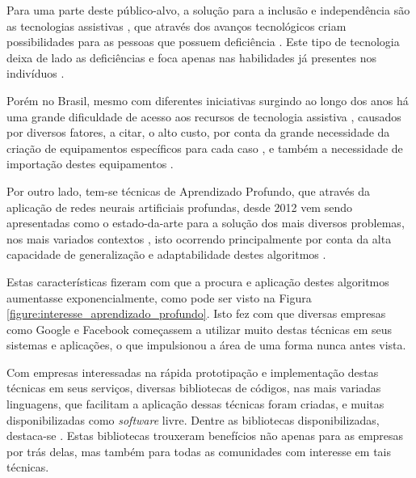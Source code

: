\par Para uma parte deste público-alvo, a solução para a inclusão e independência são as tecnologias assistivas \cite{ANDRIOLI2017}, que através dos avanços tecnológicos criam possibilidades para as pessoas que possuem deficiência \cite{Bersch2017}. Este tipo de tecnologia deixa de lado as deficiências e foca apenas nas habilidades já presentes nos indivíduos \cite{tve2016}.

\par Porém no Brasil, mesmo com diferentes iniciativas surgindo ao longo dos anos \cite{Bersch2017} há uma grande dificuldade de acesso aos recursos de tecnologia assistiva \cite{ANDRIOLI2017}, causados por diversos fatores, a citar, o alto custo, por conta da grande necessidade da criação de equipamentos específicos para cada caso \cite{tve2016}, e também a necessidade de importação destes equipamentos \cite{ANDRIOLI2017}.

\par Por outro lado, tem-se técnicas de Aprendizado Profundo, que através da aplicação de redes neurais artificiais profundas, desde 2012 vem sendo apresentadas como o estado-da-arte para a solução dos mais diversos problemas, nos mais variados contextos \cite{Ponti2018, forbes2019}, isto ocorrendo principalmente por conta da alta capacidade de generalização e adaptabilidade destes algoritmos \cite{Camila2017, Ponti2018, forbes2019}.

\par Estas características fizeram com que a procura e aplicação destes algoritmos aumentasse exponencialmente, como pode ser visto na Figura \ref{figure:interesse_aprendizado_profundo}. Isto fez com que diversas empresas como Google e Facebook começassem a utilizar muito destas técnicas em seus sistemas e aplicações, o que impulsionou a área de uma forma nunca antes vista.


\par Com empresas interessadas na rápida prototipação e implementação destas técnicas em seus serviços, diversas bibliotecas de códigos, nas mais variadas linguagens, que facilitam a aplicação dessas técnicas foram criadas, e muitas disponibilizadas como \textit{software} livre. Dentre as bibliotecas disponibilizadas, destaca-se \cite{pytorch2017, tensorflowjs2019, tensorflow2015-whitepaper, chollet2015}. Estas bibliotecas trouxeram benefícios não apenas para as empresas por trás delas, mas também para todas as comunidades com interesse em tais técnicas.

